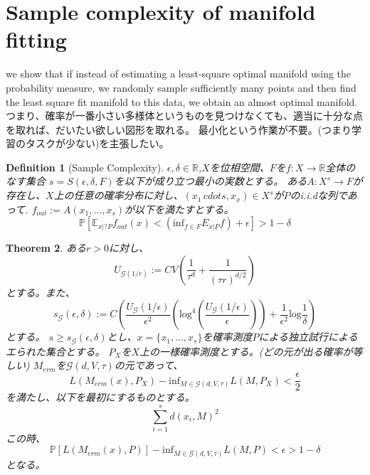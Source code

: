 \documentclass{jarticle}
\newtheorem{thm}{Theorem}[section]
\newtheorem{dfn}[thm]{Definition}
\begin{document}
\section{Sample complexity of manifold fitting}
\label{Sample complexity of manifold fitting}

we show that if instead of estimating a least-square optimal manifold using the probability
measure, we randomly sample sufficiently many points and then find the least square fit manifold to this
data, we obtain an almost optimal manifold.
つまり、確率が一番小さい多様体というものを見つけなくても、適当に十分な点を取れば、だいたい欲しい図形を取れる。
最小化という作業が不要。(つまり学習のタスクが少ない)を主張したい。

\begin{dfn}[Sample Complexity]
$\epsilon, \delta \in \mathbb{R}$,$X$を位相空間、$F$を$f:X \to \mathbb{R}$全体のなす集合
$s=S(\epsilon,\delta,F)$を以下が成り立つ最小の実数とする。
ある$A:X^s \to F$が存在し、$X$上の任意の確率分布に対し、$(x_1\,cdots ,x_x) \in X^s$が$P$のi.i.dな列であって.
$f_{out}:= A(x_1,\dots,x_s)$が以下を満たすとする。
\begin{equation*}
 \mathbb{P}[\mathbb{E}_{x|?P}f_{out}(x) < (\mathrm{inf}_{f \in F}E_{x|P}f) + \epsilon ] > 1 - \delta
\end{equation*}

\end{dfn}

\begin{thm}
 ある$r > 0$に対し、
 \begin{equation*}
  U_{\mathcal{G}(1/r)}:=CV( \frac{ 1 }{ \tau^d } + \frac{ 1 }{ (\tau r)^{d/2} } )
 \end{equation*}
 とする。また、
 \begin{equation*}
  s_{\mathcal{G}}(\epsilon,\delta):=C(\frac{ U_{\mathcal{G}}(1/\epsilon) }{ \epsilon^2 }(\mathrm{log}^4
  (\frac{U_{\mathcal{G}}(1/\epsilon)}{\epsilon})) + \frac{ 1 }{ \epsilon^2 }\mathrm{log}\frac{ 1 }{ \delta }  )
 \end{equation*}
とする。
$s \ge s_{\mathcal{G}}(\epsilon,\delta)$とし、$x=\{ x_1,\dots,x_s\}$を確率測度$P$による独立試行によるエられた集合とする。
$P_X$を$X$上の一様確率測度とする。(どの元が出る確率が等しい)
$M_{erm}$を$\mathcal{G}(d,V,\tau)$の元であって、
\begin{equation*}
 L(M_{erm}(x),P_X) - \mathrm{inf}_{M \in \mathcal{G}(d,V,\tau)} L(M,P_X) < \frac{ \epsilon }{ 2 }
\end{equation*}
を満たし、以下を最初にするものとする。
\begin{equation*}
 \sum_{i=1}^sd(x_i,M)^2
\end{equation*}
この時、
\begin{equation*}
 \mathbb{P}[L(M_{erm}(x),P)] - \mathrm{inf}_{M \in \mathcal{G}(d,V,\tau)} L(M,P) < \epsilon > 1- \delta
\end{equation*}
となる。
\end{thm}
\end{document}
